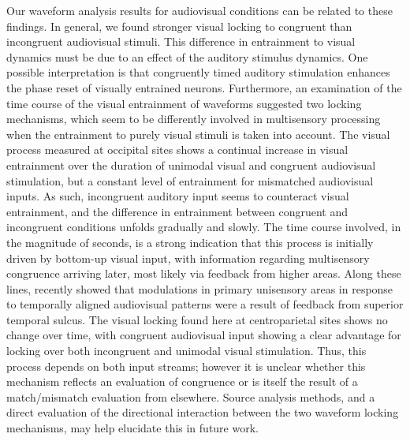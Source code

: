Our waveform analysis results for audiovisual conditions can be related to
these findings. In general, we found stronger visual locking to congruent
than incongruent audiovisual stimuli. This difference in entrainment to
visual dynamics must be due to an effect of the auditory stimulus dynamics.
One possible interpretation is that congruently timed auditory stimulation
enhances the phase reset of visually entrained neurons. Furthermore, an
examination of the time course of the visual entrainment of waveforms
suggested two locking mechanisms, which seem to be differently involved in
multisensory processing when the entrainment to purely visual stimuli is
taken into account. The visual process measured at occipital sites shows a
continual increase in visual entrainment over the duration of unimodal
visual and congruent audiovisual stimulation, but a constant level of
entrainment for mismatched audiovisual inputs. As such, incongruent
auditory input seems to counteract visual entrainment, and the difference
in entrainment between congruent and incongruent conditions unfolds
gradually and slowly. The time course involved, in the magnitude of
seconds, is a strong indication that this process is initially driven by
bottom-up visual input, with information regarding multisensory congruence
arriving later, most likely via feedback from higher areas. Along these
lines, \cite{noesselt2007a} recently showed that modulations in primary
unisensory areas in response to temporally aligned audiovisual patterns
were a result of feedback from superior temporal sulcus. The visual locking
found here at centroparietal sites shows no change over time, with
congruent audiovisual input showing a clear advantage for locking over both
incongruent and unimodal visual stimulation. Thus, this process depends on
both input streams; however it is unclear whether this mechanism reflects
an evaluation of congruence or is itself the result of a match/mismatch
evaluation from elsewhere. Source analysis methods, and a direct evaluation
of the directional interaction between the two waveform locking mechanisms,
may help elucidate this in future work.



